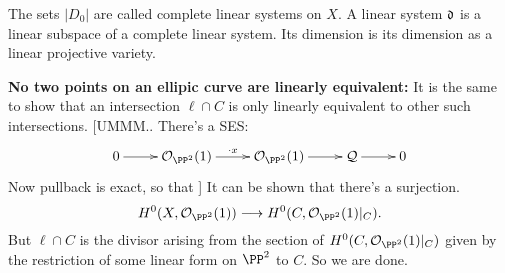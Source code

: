 \documentclass[11pt]{article}
\begin{document}
\begin{II.7 Projective Morphisms}
\begin{itemise}
\[{}\]
The sets $|D_0|$ are called complete linear systems on $X$. A linear system $\mathfrak{d}$ is a
linear subspace of a complete linear system. Its dimension is its dimension as a
linear projective variety.
\item \textbf{No two points on an ellipic curve are linearly equivalent:} It is
the same to show that an intersection $\ell\cap C$ is only linearly equivalent
to other such intersections. [UMMM.. There's a SES:
\[\xymatrix{
0\ar[r]&
\calO_{\PP^2}(1)\ar[r]^{\cdot x}&
\calO_{\PP^2}(1)\ar[r]&
\calQ\ar[r]&
0
}\]
Now pullback is exact, so that ]
It can be shown that there's a surjection.
\[ H^{0}(X,\calO_{\PP^2}(1))\to H^{0}(C,\calO_{\PP^2}(1)|_{C}).\]
But $\ell\cap C$ is the divisor arising from the section of
$H^0(C,\calO_{\PP^2}(1)|_{C})$ given by the restriction of some linear form on
$\PP^2$ to $C$. So we are done.
\end{itemise}
\end{II.7 Projective Morphisms}

\printindex
\end{document}
